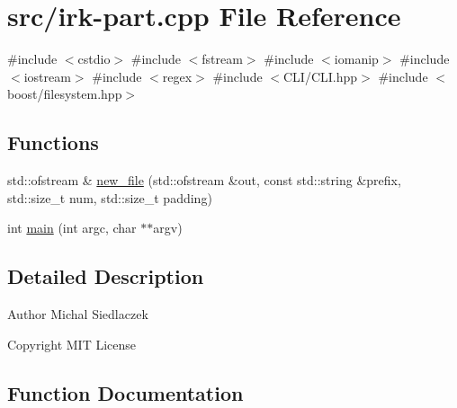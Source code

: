 \hypertarget{irk-part_8cpp}{}\section{src/irk-\/part.cpp File Reference}
\label{irk-part_8cpp}
{\ttfamily \#include $<$cstdio$>$}\newline
{\ttfamily \#include $<$fstream$>$}\newline
{\ttfamily \#include $<$iomanip$>$}\newline
{\ttfamily \#include $<$iostream$>$}\newline
{\ttfamily \#include $<$regex$>$}\newline
{\ttfamily \#include $<$C\+L\+I/\+C\+L\+I.\+hpp$>$}\newline
{\ttfamily \#include $<$boost/filesystem.\+hpp$>$}\newline
\subsection*{Functions}
\begin{DoxyCompactItemize}
\item 
std\+::ofstream \& \mbox{\hyperlink{irk-part_8cpp_a2af07694fa5e0af7134d2a71053b7519}{new\+\_\+file}} (std\+::ofstream \&out, const std\+::string \&prefix, std\+::size\+\_\+t num, std\+::size\+\_\+t padding)
\item 
int \mbox{\hyperlink{irk-part_8cpp_a3c04138a5bfe5d72780bb7e82a18e627}{main}} (int argc, char $\ast$$\ast$argv)
\end{DoxyCompactItemize}


\subsection{Detailed Description}
\begin{DoxyAuthor}{Author}
Michal Siedlaczek 
\end{DoxyAuthor}
\begin{DoxyCopyright}{Copyright}
M\+IT License 
\end{DoxyCopyright}


\subsection{Function Documentation}
\mbox{\label{irk-part_8cpp_a3c04138a5bfe5d72780bb7e82a18e627}} 

